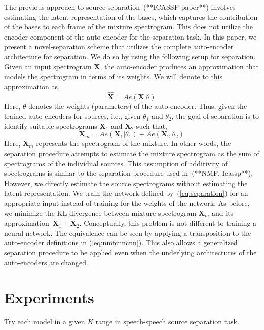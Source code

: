 \documentclass{article}
\begin{document}
The previous approach to source separation~\cite{}(**ICASSP paper**) involves estimating the latent representation of the bases, which captures the contribution of the bases to each frame of the mixture spectrogram. This does not utilize the encoder component of the auto-encoder for the separation task. In this paper, we present a novel-separation scheme that utilizes the complete auto-encoder architecture for separation. We do so by using the following setup for separation. Given an input spectrogram $\mathbf{X}$, the auto-encoder produces an approximation that models the spectrogram in terms of its weights. We will denote to this approximation as,
\begin{equation}
    \hat{\mathbf{X}} = Ae(\mathbf{X}|\theta)
    \label{eq:separation_ae}
\end{equation}
Here, $\theta$ denotes the weights (parameters) of the auto-encoder. Thus, given the trained auto-encoders for sources, i.e., given $\theta_{1}$ and $\theta_{2}$, the goal of separation is to identify suitable spectrograms $\mathbf{X}_{1}$ and $\mathbf{X}_{2}$ such that,
\begin{equation}
    \mathbf{X}_{m} = Ae(\mathbf{X}_{1}|\theta_{1}) + Ae(\mathbf{X}_{2}|\theta_{2}) 
    \label{eq:separation}
\end{equation}
Here, $\mathbf{X}_{m}$ represents the spectrogram of the mixture. In other words, the separation procedure attempts to estimate the mixture spectrogram as the sum of spectrograms of the individual sources. This assumption of additivity of spectrograms is similar to the separation procedure used in~\cite{}(**NMF, Icassp**). However, we directly estimate the source spectrograms without estimating the latent representation. We train the network defined by~(\ref{eq:separation}) for an appropriate input instead of training for the weights of the network. As before, we minimize the KL divergence between mixture spectrogram $\mathbf{X}_{m}$ and its approximation~$\mathbf{X}_{1} + \mathbf{X}_{2}$. Conceptually, this problem is not different to training a neural network. The equivalence can be seen by applying a transposition to the auto-encoder definitions in (\ref{eq:nmfcnncnn}). This also allows a generalized separation procedure to be applied even when the underlying architectures of the auto-encoders are changed.




\section{Experiments}
\label{sec:experiments}
Try each model in a given $K$ range in speech-speech source separation task.
\end{document}
